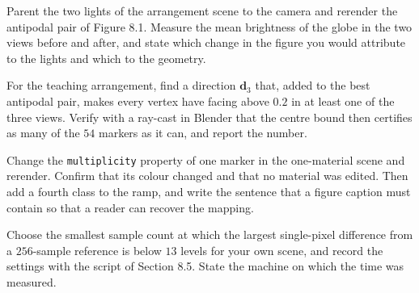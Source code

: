 \begin{exercise}
Parent the two lights of the arrangement scene to the camera and rerender the antipodal pair of Figure 8.1. Measure the mean brightness of the globe in the two views before and after, and state which change in the figure you would attribute to the lights and which to the geometry.
\end{exercise}

\begin{exercise}
For the teaching arrangement, find a direction $\mathbf d_3$ that, added to the best antipodal pair, makes every vertex have facing above $0.2$ in at least one of the three views. Verify with a ray-cast in Blender that the centre bound then certifies as many of the $54$ markers as it can, and report the number.
\end{exercise}

\begin{exercise}
Change the \texttt{multiplicity} property of one marker in the one-material scene and rerender. Confirm that its colour changed and that no material was edited. Then add a fourth class to the ramp, and write the sentence that a figure caption must contain so that a reader can recover the mapping.
\end{exercise}

\begin{exercise}
Choose the smallest sample count at which the largest single-pixel difference from a $256$-sample reference is below $13$ levels for your own scene, and record the settings with the script of Section 8.5. State the machine on which the time was measured.
\end{exercise}
